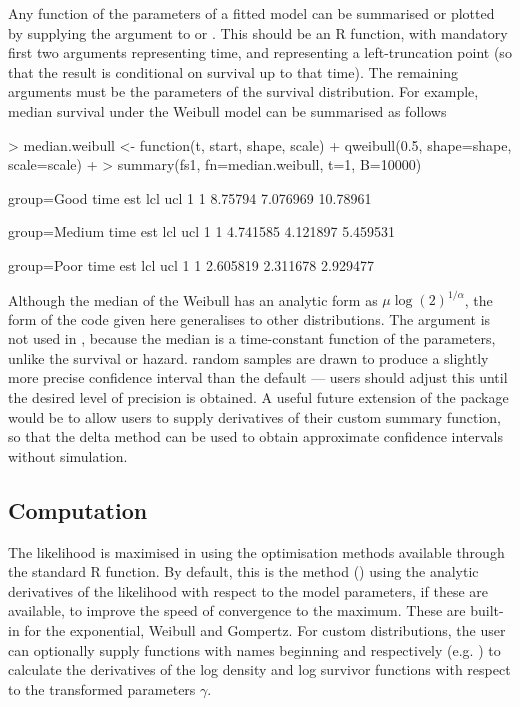\documentclass[nojss,nofooter]{jss}
\begin{document}
Any function of the parameters of a fitted model can be summarised or plotted by
supplying the argument  to  or
.  This should be an R function, with mandatory
first two arguments  representing time, and 
representing a left-truncation point (so that the result is
conditional on survival up to that time). The remaining arguments must
be the parameters of the survival distribution.  For example, median 
survival under the Weibull model  can be summarised as follows
\begin{Schunk}
\begin{Sinput}
> median.weibull <- function(t, start, shape, scale) { 
+     qweibull(0.5, shape=shape, scale=scale) 
+ }
> summary(fs1, fn=median.weibull, t=1, B=10000)
\end{Sinput}
\begin{Soutput}
group=Good 
  time     est      lcl      ucl
1    1 8.75794 7.076969 10.78961

group=Medium 
  time      est      lcl      ucl
1    1 4.741585 4.121897 5.459531

group=Poor 
  time      est      lcl      ucl
1    1 2.605819 2.311678 2.929477
\end{Soutput}
\end{Schunk}
Although the median of the Weibull has an analytic form as $\mu
\log(2)^{1/\alpha}$, the form of the code given here generalises to
other distributions.
The argument  is not used in , because
the median is a time-constant function of the parameters, unlike the
survival or hazard.   random samples are drawn to produce
a slightly more precise confidence interval than the default --- users
should adjust this until the desired level of precision is obtained.
A useful future extension of the package would be to allow users to 
supply derivatives of their custom summary function, so that the 
delta method can be used to obtain approximate confidence intervals 
without simulation.


\subsection{Computation}

The likelihood is maximised in  using the
optimisation methods available through the standard R 
function.  By default, this is the  method (\citep{nash})
using the analytic derivatives of the likelihood with respect to the
model parameters, if these are available, to improve the speed of
convergence to the maximum.  These are built-in for the exponential,
Weibull and Gompertz.  %
For custom distributions, the user can optionally supply functions
with names beginning  and  respectively
(e.g. ) to calculate the derivatives of
the log density and log survivor functions with respect to the
transformed parameters $\gamma$.
\end{document}
